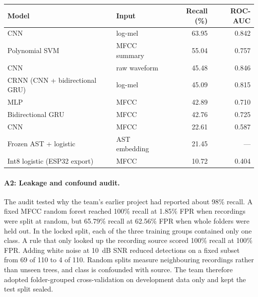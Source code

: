 \begin{table}[htbp]
\centering
\color{black}
\small
\caption{}
\label{tab:ml_a1}
\begin{tabular}{llrr}
\toprule
Model & Input & Recall (\%) & ROC-AUC \\
\midrule
CNN & log-mel & 63.95 & 0.842 \\
Polynomial SVM & MFCC summary & 55.04 & 0.757 \\
CNN & raw waveform & 45.48 & 0.846 \\
CRNN (CNN + bidirectional GRU) & log-mel & 45.09 & 0.815 \\
MLP & MFCC & 42.89 & 0.710 \\
Bidirectional GRU & MFCC & 42.76 & 0.725 \\
CNN & MFCC & 22.61 & 0.587 \\
Frozen AST + logistic & AST embedding & 21.45 & --- \\
Int8 logistic (ESP32 export) & MFCC & 10.72 & 0.404 \\
\bottomrule
\end{tabular}
\end{table}

\paragraph{A2: Leakage and confound audit.} The audit tested why the team's earlier project had reported about 98\% recall. A fixed MFCC random forest reached 100\% recall at 1.85\% FPR when recordings were split at random, but 65.79\% recall at 62.56\% FPR when whole folders were held out. In the locked split, each of the three training groups contained only one class. A rule that only looked up the recording source scored 100\% recall at 100\% FPR. Adding white noise at 10~dB SNR reduced detections on a fixed subset from 69 of 110 to 4 of 110. Random splits measure neighbouring recordings rather than unseen trees, and class is confounded with source. The team therefore adopted folder-grouped cross-validation on development data only and kept the test split sealed.

